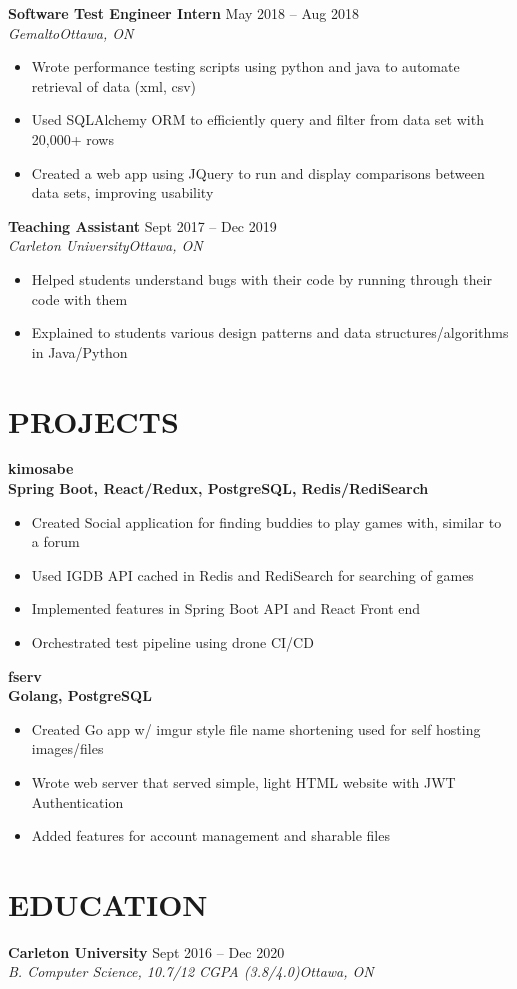 \documentclass[8pt, letterpaper]{article}
\newcommand{\NewPart}[1]{\section*{\uppercase{\textbf{#1}}}}
\newcommand{\DatedEntry}[5]{\large\textbf{#1}
	\hfill #2\\\normalsize
	\textit{#3}\hfill\textit{#4}\\\vspace{0.10cm}
	#5
}
\newcommand{\ProjectEntry}[3]{\large\textbf{#1}
	\normalsize\\ \textbf{#2}\\\vspace{0.1cm}
	#3\vspace{0.12cm}
}
\begin{document}
\DatedEntry{Software Test Engineer Intern}
{May 2018 -- Aug 2018}
{Gemalto}
{Ottawa, ON}
{\begin{itemize}[nolistsep]
	\item Wrote performance testing scripts using python and java to automate retrieval of data (xml, csv)
	\item Used SQLAlchemy ORM to efficiently query and filter from data set with 20,000+ rows
	\item Created a web app using JQuery to run and display comparisons between data sets, improving usability
\end{itemize}}
\DatedEntry{Teaching Assistant}
{Sept 2017 -- Dec 2019}
{Carleton University}
{Ottawa, ON}
{\begin{itemize}[nolistsep]
	\item Helped students understand bugs with their code by running through their code with them
	\item Explained to students various design patterns and data structures/algorithms  in Java/Python
\end{itemize}}

\NewPart{Projects}{}
\ProjectEntry{kimosabe}
{Spring Boot, React/Redux, PostgreSQL, Redis/RediSearch}
{\begin{itemize}
	\item Created Social application for finding buddies to play games with, similar to a forum
	\item Used IGDB API cached in Redis and RediSearch for searching of games
	\item Implemented features in Spring Boot API and React Front end
	\item Orchestrated test pipeline using drone CI/CD
\end{itemize}}
\ProjectEntry{fserv}
{Golang, PostgreSQL}
{\begin{itemize}
	\item Created Go app w/ imgur style file name shortening used for self hosting images/files
	\item Wrote web server that served simple, light HTML website with JWT Authentication
	\item Added features for account management and sharable files
\end{itemize}}

\NewPart{Education}{}
\DatedEntry{Carleton University}
{Sept 2016 -- Dec 2020}
{B. Computer Science, 10.7/12 CGPA (3.8/4.0)}
{Ottawa, ON}
\end{document}
